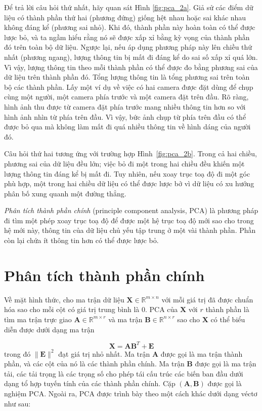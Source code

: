 \documentclass[14pt,oneside,a4paper]{report}
\numberwithin{equation}{section}
\begin{document}
Để trả lời câu hỏi thứ nhất, hãy quan sát Hình \ref{fig:pca_2a}. Giả sử các
điểm dữ liệu có thành phần thứ hai (phương đứng) giống hệt nhau hoặc sai khác
nhau không đáng kể (phương sai nhỏ). Khi đó, thành phần này hoàn toàn có thể được lược
bỏ, và ta ngầm hiểu rằng nó sẽ được xấp xỉ bằng kỳ vọng của thành phần đó
trên toàn bộ dữ liệu. Ngược lại, nếu áp dụng phương pháp này lên chiều thứ nhất (phương ngang), {lượng thông tin} bị mất đi đáng kể do sai số xấp xỉ quá lớn. Vì vậy, lượng thông tin theo mỗi thành phần có thể được đo bằng phương sai của dữ liệu trên thành phần đó. Tổng lượng
thông tin là tổng phương sai trên toàn bộ các thành phần. Lấy
một ví dụ về việc có hai camera được đặt dùng để chụp cùng một người, một camera
phía trước và một camera đặt trên đầu. Rõ ràng, hình ảnh thu được từ
camera đặt phía trước mang nhiều thông tin hơn so với hình ảnh nhìn từ
phía trên đầu. Vì vậy, bức ảnh chụp từ phía trên đầu có thể được bỏ qua mà không
làm mất đi quá nhiều thông tin về hình dáng của người đó.

Câu hỏi thứ hai tương ứng với trường hợp Hình~\ref{fig:pca_2b}. Trong cả hai
chiều, phương sai của dữ liệu đều lớn; việc bỏ đi một trong hai chiều đều khiến
một lượng thông tin đáng kể bị mất đi. Tuy nhiên, nếu xoay trục toạ độ đi một
góc phù hợp, một trong hai chiều dữ liệu có thể được lược bở vì dữ liệu có xu
hướng phân bố xung quanh một đường thẳng.

\textit{Phân tích thành phần chính} (principle component analysis, PCA) là
phương pháp đi tìm một phép xoay trục toạ độ để được một hệ trục toạ độ mới sao
cho trong hệ mới này, thông tin của dữ liệu chủ yếu tập trung ở một vài thành
phần. Phần còn lại chứa ít thông tin hơn có thể được lược bỏ.

\section{Phân tích thành phần chính}

Về mặt hình thức, cho ma trận dữ liệu $\mathbf{X} \in \mathbb{R}^{m \times n}$ với mỗi giá trị đã được chuẩn hóa sao cho mỗi cột có giá trị trung bình là 0. PCA của $\mathbf{X}$ với $r$ thành phần là tìm ma trận trực giao $\mathbf{A} \in \mathbb{R}^{m \times r}$ và ma trận $\mathbf{B} \in \mathbb{R}^{n \times r}$ sao cho $\mathbf{X}$ có thể biểu diễn được dưới dạng ma trận

$$
\mathbf{X}=\mathbf{A} \mathbf{B}^{T}+\mathbf{E}
$$
trong đó $\|\mathbf{E}\|^{2}$ đạt giá trị nhỏ nhất. Ma trận $\mathbf{A}$ được gọi là ma trận thành phần, và các cột của nó là các thành phần chính. Ma trận $\mathbf{B}$ được gọi là ma trận tải, các tải trọng là các trọng số cho phép tái cấu trúc các biến ban đầu dưới dạng tổ hợp tuyến tính của các thành phần chính. Cặp $(\mathbf{A}, \mathbf{B})$ được gọi là nghiệm PCA.
Ngoài ra, PCA được trình bày theo một cách khác dưới dạng véctơ như sau:
\end{document}
